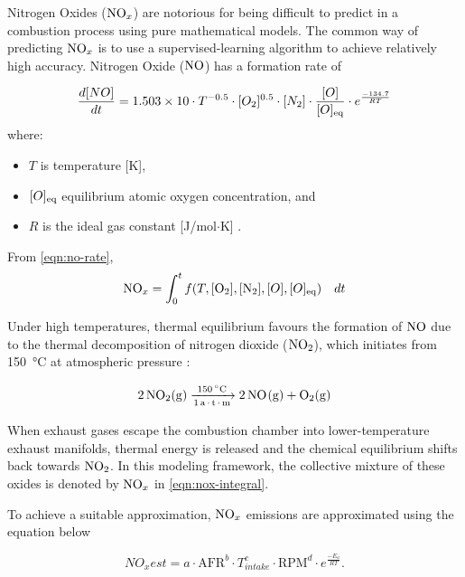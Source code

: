 \documentclass[runningheads]{llncs}
\begin{document}
Nitrogen Oxides ($\ce{NO_x}$) are notorious for being difficult to predict in a combustion process using pure
mathematical models. The common way of predicting $\ce{NO_x}$ is to use a supervised-learning algorithm to achieve
relatively high accuracy. Nitrogen Oxide ($\ce{NO}$) has a formation rate \cite{THOMPSON1973787} of

\begin{equation}
	\frac{d[NO]}{dt} = 1.503 \times 10 \cdot T^{-0.5} \cdot [O_2]^{0.5}
	\cdot [N_2] \cdot \frac{[O]}{[O]\textsubscript{eq}} \cdot e^{\frac{-134.7}{RT}}
	\label{eqn:no-rate}
\end{equation}
where:
\begin{itemize}
	\item $T$ is temperature [K],
	\item $[O]\textsubscript{eq}$ equilibrium atomic oxygen concentration, and
	\item $R$ is the ideal gas constant [J/mol$ \cdot $K] .
\end{itemize}
From \eqref{eqn:no-rate},
\begin{equation}
	\ce{NO_x} = \int_{0}^{t} f(T, [\ce{O_2}], [\ce{N_2}], [O], [O]\textsubscript{eq}) \quad dt
	\label{eqn:nox-integral}
\end{equation}

Under high temperatures, thermal equilibrium favours the formation of $\ce{NO}$ due to the thermal decomposition of
nitrogen dioxide ($\ce{NO_2}$), which initiates from \SI{150}{\degreeCelsius} at atmospheric pressure
\cite{nitrogenDioxideThermalDecomposition}:

\begin{equation}
	\ce{2NO2(g) ->[\SI{150}{\degreeCelsius}][1 a.t.m] 2NO(g) + O2(g)}\label{eq:no2tono}
\end{equation}

When exhaust gases escape the combustion chamber into lower-temperature exhaust manifolds, thermal energy is released
and the chemical equilibrium shifts back towards $\ce{NO_2}$. In this modeling framework, the collective mixture of
these oxides is denoted by $\ce{NO_x}$ in \eqref{eqn:nox-integral}.

To achieve a suitable approximation, $\ce{NO_x}$ emissions are approximated using the equation below

\begin{equation}
	NO_x{est} = a \cdot \text{AFR}^b \cdot T_{intake}^c \cdot
	\text{RPM}^d \cdot e^{\frac{-E_a}{RT}}. \label{eqn:nox-estimate}
\end{equation}
\end{document}
